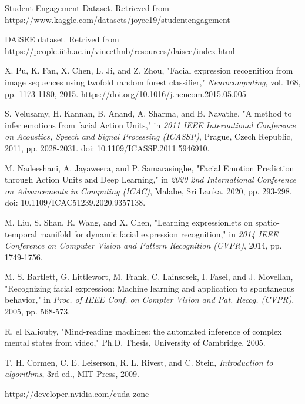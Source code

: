 \begin{thebibliography}{9}
    Student Engagement Dataset. Retrieved from 
    \url{https://www.kaggle.com/datasets/joyee19/studentengagement}

    DAiSEE dataset. Retrived from \url{https://people.iith.ac.in/vineethnb/resources/daisee/index.html}

     X. Pu, K. Fan, X. Chen, L. Ji, and Z. Zhou, "Facial expression recognition from image sequences using twofold random forest classifier," \textit{Neurocomputing}, vol. 168, pp. 1173-1180, 2015. https://doi.org/10.1016/j.neucom.2015.05.005
    
     S. Velusamy, H. Kannan, B. Anand, A. Sharma, and B. Navathe, "A method to infer emotions from facial Action Units," in \textit{2011 IEEE International Conference on Acoustics, Speech and Signal Processing (ICASSP)}, Prague, Czech Republic, 2011, pp. 2028-2031. doi: 10.1109/ICASSP.2011.5946910.
    
     M. Nadeeshani, A. Jayaweera, and P. Samarasinghe, "Facial Emotion Prediction through Action Units and Deep Learning," in \textit{2020 2nd International Conference on Advancements in Computing (ICAC)}, Malabe, Sri Lanka, 2020, pp. 293-298. doi: 10.1109/ICAC51239.2020.9357138.
    
     M. Liu, S. Shan, R. Wang, and X. Chen, "Learning expressionlets on spatio-temporal manifold for dynamic facial expression recognition," in \textit{2014 IEEE Conference on Computer Vision and Pattern Recognition (CVPR)}, 2014, pp. 1749-1756.
    
     M. S. Bartlett, G. Littlewort, M. Frank, C. Lainscsek, I. Fasel, and J. Movellan, "Recognizing facial expression: Machine learning and application to spontaneous behavior," in \textit{Proc. of IEEE Conf. on Compter Vision and Pat. Recog. (CVPR)}, 2005, pp. 568-573.
    
     R. el Kaliouby, "Mind-reading machines: the automated inference of complex mental states from video," Ph.D. Thesis, University of Cambridge, 2005.
    
     T. H. Cormen, C. E. Leiserson, R. L. Rivest, and C. Stein, \textit{Introduction to algorithms}, 3rd ed., MIT Press, 2009.
    
     \url{https://developer.nvidia.com/cuda-zone} 
    

\end{thebibliography}
